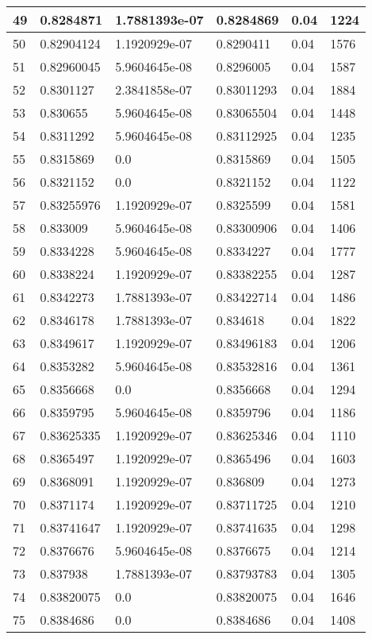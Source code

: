 \begin{longtable}{|l|l|l|l|l|l|}
49 & 0.8284871 & 1.7881393e-07 & 0.8284869 & 0.04 & 1224 \\ \hline 
50 & 0.82904124 & 1.1920929e-07 & 0.8290411 & 0.04 & 1576 \\ \hline 
51 & 0.82960045 & 5.9604645e-08 & 0.8296005 & 0.04 & 1587 \\ \hline 
52 & 0.8301127 & 2.3841858e-07 & 0.83011293 & 0.04 & 1884 \\ \hline 
53 & 0.830655 & 5.9604645e-08 & 0.83065504 & 0.04 & 1448 \\ \hline 
54 & 0.8311292 & 5.9604645e-08 & 0.83112925 & 0.04 & 1235 \\ \hline 
55 & 0.8315869 & 0.0 & 0.8315869 & 0.04 & 1505 \\ \hline 
56 & 0.8321152 & 0.0 & 0.8321152 & 0.04 & 1122 \\ \hline 
57 & 0.83255976 & 1.1920929e-07 & 0.8325599 & 0.04 & 1581 \\ \hline 
58 & 0.833009 & 5.9604645e-08 & 0.83300906 & 0.04 & 1406 \\ \hline 
59 & 0.8334228 & 5.9604645e-08 & 0.8334227 & 0.04 & 1777 \\ \hline 
60 & 0.8338224 & 1.1920929e-07 & 0.83382255 & 0.04 & 1287 \\ \hline 
61 & 0.8342273 & 1.7881393e-07 & 0.83422714 & 0.04 & 1486 \\ \hline 
62 & 0.8346178 & 1.7881393e-07 & 0.834618 & 0.04 & 1822 \\ \hline 
63 & 0.8349617 & 1.1920929e-07 & 0.83496183 & 0.04 & 1206 \\ \hline 
64 & 0.8353282 & 5.9604645e-08 & 0.83532816 & 0.04 & 1361 \\ \hline 
65 & 0.8356668 & 0.0 & 0.8356668 & 0.04 & 1294 \\ \hline 
66 & 0.8359795 & 5.9604645e-08 & 0.8359796 & 0.04 & 1186 \\ \hline 
67 & 0.83625335 & 1.1920929e-07 & 0.83625346 & 0.04 & 1110 \\ \hline 
68 & 0.8365497 & 1.1920929e-07 & 0.8365496 & 0.04 & 1603 \\ \hline 
69 & 0.8368091 & 1.1920929e-07 & 0.836809 & 0.04 & 1273 \\ \hline 
70 & 0.8371174 & 1.1920929e-07 & 0.83711725 & 0.04 & 1210 \\ \hline 
71 & 0.83741647 & 1.1920929e-07 & 0.83741635 & 0.04 & 1298 \\ \hline 
72 & 0.8376676 & 5.9604645e-08 & 0.8376675 & 0.04 & 1214 \\ \hline 
73 & 0.837938 & 1.7881393e-07 & 0.83793783 & 0.04 & 1305 \\ \hline 
74 & 0.83820075 & 0.0 & 0.83820075 & 0.04 & 1646 \\ \hline 
75 & 0.8384686 & 0.0 & 0.8384686 & 0.04 & 1408 \\ \hline 
\end{longtable}